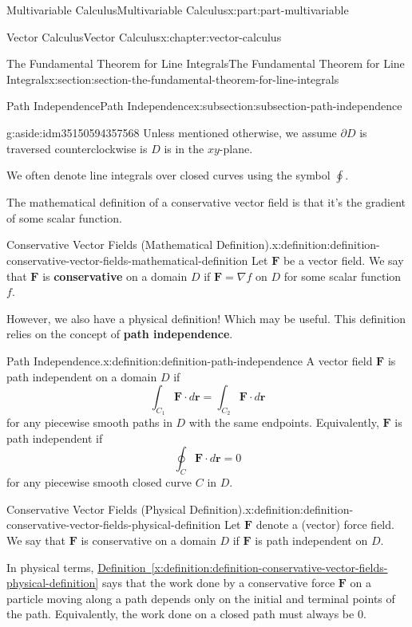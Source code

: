 \documentclass[twoside,10pt,]{book}
\newcommand{\xreffont}{\relax}
\newcommand{\terminology}[1]{\textbf{#1}}
\numberwithin{equation}{part}
\newcommand{\grad}{\nabla}
\newcommand{\vb}[1]{\mathbf{#1}}
\newcommand{\dr}{\cdot d\vb{r}}
\begin{document}
\begin{partptx}{Multivariable Calculus}{}{Multivariable Calculus}{}{}{x:part:part-multivariable}
\begin{chapterptx}{Vector Calculus}{}{Vector Calculus}{}{}{x:chapter:vector-calculus}
\begin{sectionptx}{The Fundamental Theorem for Line Integrals}{}{The Fundamental Theorem for Line Integrals}{}{}{x:section:section-the-fundamental-theorem-for-line-integrals}
\begin{subsectionptx}{Path Independence}{}{Path Independence}{}{}{x:subsection:subsection-path-independence}
\begin{aside}{}{g:aside:idm35150594357568}
Unless mentioned otherwise, we assume \(\partial D\) is traversed counterclockwise is \(D\) is in the \(xy\)-plane.%
\end{aside}
 We often denote line integrals over closed curves using the symbol \(\oint\).%
\par
The mathematical definition of a conservative vector field is that it's the gradient of some scalar function.%
\begin{definition}{Conservative Vector Fields (Mathematical Definition).}{x:definition:definition-conservative-vector-fields-mathematical-definition}%
%
Let \(\vb{F}\) be a vector field. We say that \(\vb{F}\) is \terminology{conservative} on a domain \(D\) if \(\vb{F} = \grad f\) on \(D\) for some scalar function \(f\).%
\end{definition}
However, we also have a physical definition! Which may be useful. This definition relies on the concept of \terminology{path independence}.%
\begin{definition}{Path Independence.}{x:definition:definition-path-independence}%
%
A vector field \(\vb{F}\) is path independent on a domain \(D\) if%
\begin{equation*}
\int_{C_{1}}\vb{F}\dr = \int_{C_{2}}\vb{F}\cdot d\vb{r}
\end{equation*}
for any piecewise smooth paths in \(D\) with the same endpoints. Equivalently, \(\vb{F}\) is path independent if%
\begin{equation*}
\oint_{C}\vb{F}\cdot d\vb{r} = 0
\end{equation*}
for any piecewise smooth closed curve \(C\) in \(D\).%
\end{definition}
\begin{definition}{Conservative Vector Fields (Physical Definition).}{x:definition:definition-conservative-vector-fields-physical-definition}%
Let \(\vb{F}\) denote a (vector) force field. We say that \(\vb{F}\) is conservative on a domain \(D\) if \(\vb{F}\) is path independent on \(D\).%
\end{definition}
In physical terms, \hyperref[x:definition:definition-conservative-vector-fields-physical-definition]{Definition~{\xreffont\ref{x:definition:definition-conservative-vector-fields-physical-definition}}} says that the work done by a conservative force \(\vb{F}\) on a particle moving along a path depends only on the initial and terminal points of the path. Equivalently, the work done on a closed path must always be \(0\).%

\end{subsectionptx}
\end{sectionptx}
\end{chapterptx}
\end{partptx}
\end{document}

